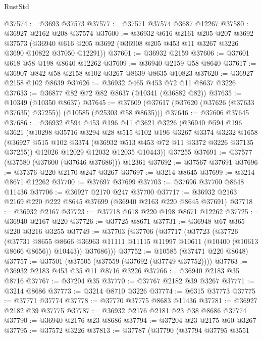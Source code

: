 \begin{lexlean}{RustStd}
\begin{coremodule}
{\begin{coremodule}
{{{{{{{{{{{{{{{{{{{{{{{{{@37574 := @3693 @37573
@37577 := @37571 @37574 @3687 @12267
@37580 := @36927 @2162 @208 @37574
@37600 := @36932
    @616
    @2161
    @205
    @207
    @3692
    @37573
    (@36940 @616 @205 @3692 (@36908 @205 @453 @11 @3267 @3226 @3690 @10822 @37050 @12291))
@37601 := @36932 @2159
@37606 := @37601 @618 @58 @198 @8640 @12262
@37609 := @36940 @2159 @58 @8640
@37617 := @36907 @842 @58 @2158 @102 @3267 @8639 @8635 @10823
@37620 := @36927 @2158 @102 @8639
@37626 := @36932 @465 @453 @72 @11 @8637 @3226
@37633 := @36877 @82 @72 @82 @8637 (@10341 (@36882 @82))
@37635 := @10349 (@10350 @8637)
@37645 := @37609 (@37617 (@37620 (@37626 (@37633 @37635) @37255)) (@10585 (@25303 @58 @8635)))
@37646 := @37606 @37645
@37686 := @36932
    @594
    @453
    @196
    @11
    @3621
    @3226
    (@36940
      @594
      @196
      @3621
      (@10298
        @35716
        @3294
        @28
        @515
        @102
        @196
        @3267
        @3374
        @3232
        @1658
        (@36927 @515 @102 @3374 (@36932 @513 @453 @72 @11 @3372 @3226 @37135 @37255))
        @12026
        @12029
        @12032
        @12035
        @10443))
    @37255
@37691 := @37577 (@37580 (@37600 (@37646 @37686))) @12361
@37692 := @37567 @37691
@37696 := @37376 @220 @2170 @247 @3267
@37697 := @3214 @8645
@37699 := @3214 @8671 @12262
@37700 := @37697 @37699
@37703 := @37696 @37700 @8648 @11436
@37706 := @36927 @2170 @247 @37700
@37717 := @36932 @2163 @2169 @220 @222 @8645 @37699 (@36940 @2163 @220 @8645 @37691)
@37718 := @36932 @2167
@37723 := @37718 @618 @220 @198 @8671 @12262
@37725 := @36940 @2167 @220
@37726 := @37725 @8671
@37731 := @36948 @67 @365 @220 @3216 @3255
@37749 := @37703
    (@37706
      (@37717
        (@37723
          (@37726
            (@37731
              @8655
              @8666
              @36963
              @11111
              @11115
              @11997
              @10611
              (@10400 (@10613 @8666 @8656))
              @10443))
          @37686)))
@37752 := @10585 (@37471 @220 @8648)
@37757 := @37501 (@37505 (@37559 (@37692 (@37749 @37752))))
@37763 := @36932 @2183 @453 @35 @11 @8716 @3226
@37766 := @36940 @2183 @35 @8716
@37767 := @37204 @35
@37770 := @37767 @2182 @39 @3267
@37771 := @3214 @8686
@37773 := @3214 @8710 @3226
@37774 := @6315 @37773
@37775 := @37771 @37774
@37778 := @37770 @37775 @8683 @11436
@37781 := @36927 @2182 @39 @37775
@37787 := @36932 @2176 @2181 @23 @38 @8686 @37774
@37790 := @36940 @2176 @23 @8686
@37794 := @37204 @23 @2175 @60 @3267
@37795 := @37572 @3226
@37813 := @37787
    (@37790
      (@37794
        @37795
        @3551
}}}}}}}}}}}}}}}}}}}}}}}}}
\end{coremodule}}
\end{coremodule}
\end{lexlean}
